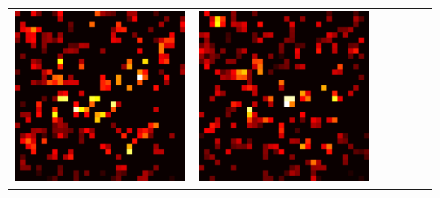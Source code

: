 \documentclass[preprint,12pt]{elsarticle}
\begin{document}
\begin{figure}[p]
\begin{tabular}{cccccc}
  \includegraphics[scale=\scale]{../visualizations/examples/cifar10/resnet18/active_saliency_map/0.png} & 
  \includegraphics[scale=\scale]{../visualizations/examples/cifar10/resnet18/inactive_saliency_map/0.png} \\
  

\end{tabular}
\end{figure}
\end{document}
